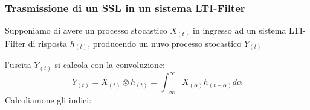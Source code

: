         \subsubsection{Trasmissione di un SSL in un sistema LTI-Filter}
            Supponiamo di avere un processo stocastico $X_{(t)}$ in ingresso ad un sistema LTI-Filter di risposta $h_{(t)}$,
            producendo un nuvo processo stocastico $Y_{(t)}$
            \begin{figure}[H]
                \centering
            \end{figure}
            l'uscita $Y_{(t)}$ si calcola con la convoluzione:
            \[
                Y_{(t)} = X_{(t)} \otimes h_{(t)} = \int_{-\infty}^{\infty} X_{(\alpha)} h_{(t-\alpha)} d\alpha
            \]
            Calcoliamone gli indici:
